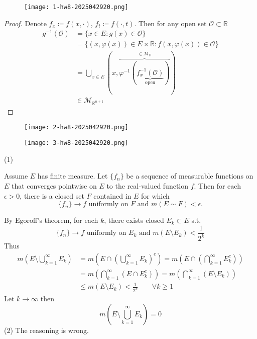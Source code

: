 \begin{exercise}
\begin{figure}[H]
\centering
\texttt{[image: 1-hw8-2025042920.png]}
\label{}
\end{figure}
\end{exercise}
\begin{proof}
Denote $f_{x}\coloneqq f(x,\cdot)$, $f_{t}\coloneqq f(\cdot,t)$. Then for any open set $\mathcal{O}\subset \mathbb{R}$
\[
\begin{aligned}
g^{-1}(\mathcal{O}) & =\{ x\in E:g(x)\in \mathcal{O} \} \\
 & =\{ (x,\varphi(x))\in E\times \mathbb{R}:f(x,\varphi(x))\in \mathcal{O} \}  \\
 & =\bigcup_{x\in E}(x,\overbrace{ \varphi ^{-1}(\underbrace{ f_{x}^{-1}(\mathcal{O}) }_{ \text{open} }) }^{ \in \mathcal{M}_{\mathbb{R}} }) \\
 & \in \mathcal{M}_{\mathbb{R}^{n+1}}
\end{aligned}
\]
\end{proof}

\begin{exercise}
\begin{figure}[H]
\centering
\texttt{[image: 2-hw8-2025042920.png]}
\label{}
\end{figure}
\begin{figure}[H]
\centering
\texttt{[image: 3-hw8-2025042920.png]}
\label{}
\end{figure}
\end{exercise}
(1)

\begin{theorem}
Assume $E$ has finite measure. Let $\{f_n\}$ be a sequence of measurable functions on $E$ that converges pointwise on $E$ to the real-valued function $f$. Then for each $\epsilon>0$, there is a closed set $F$ contained in $E$ for which
\[
\{f_n\} \rightarrow f \text { uniformly on } F \text { and } m(E \sim F)<\epsilon .
\]
\end{theorem}
By Egoroff's theorem, for each $k$, there exists closed $E_k\subset E$ s.t.
\[
\{ f_n \}\to f\text{ uniformly on }E_k\text{ and }m(E\setminus E_k)<\frac{1}{2^{k}}
\]
Thus
\[
\begin{aligned}
m\left( E\setminus \bigcup_{k=1}^{\infty} E_k \right) & =m\left( E\cap\left( \bigcup_{k=1}^{\infty} E_k \right)^{c} \right)=m\left( E\cap \left( \bigcap_{k=1}^{\infty} E_k^{c} \right) \right) \\
 & =m\left( \bigcap_{k=1}^{\infty} (E\cap E_k^{c}) \right)=m\left( \bigcap_{k=1}^{\infty} (E\setminus E_k) \right) \\
 & \leq m(E\setminus E_k)<\frac{1}{2^{k}}\qquad \forall k\geq 1
\end{aligned}
\]
Let $k\to \infty$ then
\[
m\left( E\setminus \bigcup_{k=1}^{\infty} E_k \right)=0
\]
(2) The reasoning is wrong.


